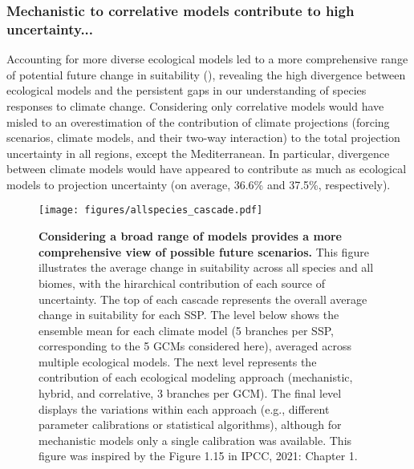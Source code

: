 \documentclass[11pt,letter]{article}
\begin{document}

\subsubsection*{Mechanistic to correlative models contribute to high uncertainty...}

Accounting for more diverse ecological models led to a more comprehensive range of potential future change in suitability (), revealing the high divergence between ecological models and the persistent gaps in our understanding of species responses to climate change. Considering only correlative models would have misled to an overestimation of the contribution of climate projections (forcing scenarios, climate models, and their two-way interaction) to the total projection uncertainty in all regions, except the Mediterranean. In particular, divergence between climate models would have appeared to contribute as much as ecological models to projection uncertainty (on average, 36.6\% and 37.5\%, respectively). 

\begin{figure}
	\centering
	\texttt{[image: figures/allspecies\_cascade.pdf]}
	\caption{\textbf{Considering a broad range of models provides a more comprehensive view of possible future scenarios.} This figure illustrates the average change in suitability across all species and all biomes, with the hirarchical contribution of each source of uncertainty. The top of each cascade represents the overall average change in suitability for each SSP. The level below shows the ensemble mean for each climate model (5 branches per SSP, corresponding to the 5 GCMs considered here), averaged across multiple ecological models. The next level represents the contribution of each ecological modeling approach (mechanistic, hybrid, and correlative, 3 branches per GCM). The final level displays the variations within each approach (e.g., different parameter calibrations or statistical algorithms), although for mechanistic models only a single calibration was available. This figure was inspired by the Figure 1.15 in IPCC, 2021: Chapter 1.}
	\label{fig:cascade}
\end{figure}
\end{document}
